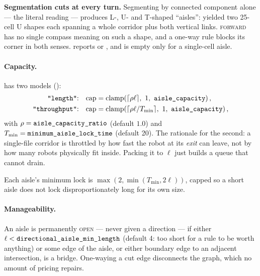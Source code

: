 \begin{caveat}
\textbf{Segmentation cuts at every turn.} Segmenting by connected component
alone --- the literal reading --- produces L-, U- and T-shaped ``aisles'':
 yielded two 25-cell U shapes each spanning a
whole corridor plus both vertical links. \textsc{forward} has no single compass
meaning on such a shape, and a one-way rule blocks its corner in both senses.
 reports  or , and is empty only for a
single-cell aisle.
\end{caveat}

\paragraph{Capacity.}  has two models
():
\begin{align}
  \text{\code{"length"}:}\quad
    &\mathrm{cap} = \mathrm{clamp}\!\left(\lceil \rho \ell \rceil,\ 1,\ \param{aisle\_capacity}\right),\\
  \text{\code{"throughput"}:}\quad
    &\mathrm{cap} = \mathrm{clamp}\!\left(\lceil \rho \ell / T_{\min} \rceil,\ 1,\ \param{aisle\_capacity}\right),
\end{align}
with $\rho = \texttt{aisle\_capacity\_ratio}$ (default $1.0$) and
$T_{\min} = \texttt{minimum\_aisle\_lock\_time}$ (default 20). The rationale for
the second: a single-file corridor is throttled by how fast the robot at its
\emph{exit} can leave, not by how many robots physically fit inside. Packing it
to $\ell$ just builds a queue that cannot drain.

Each aisle's minimum lock is
$\max(2, \min(T_{\min}, 2\ell))$, capped so a short aisle does not lock
disproportionately long for its own size.

\paragraph{Manageability.} An aisle is permanently \textsc{open} --- never
given a direction --- if either $\ell < \texttt{directional\_aisle\_min\_length}$
(default 4: too short for a rule to be worth anything) or some edge of the
aisle, or either boundary edge to an adjacent intersection, is a bridge.
One-waying a cut edge disconnects the graph, which no amount of pricing
repairs.
